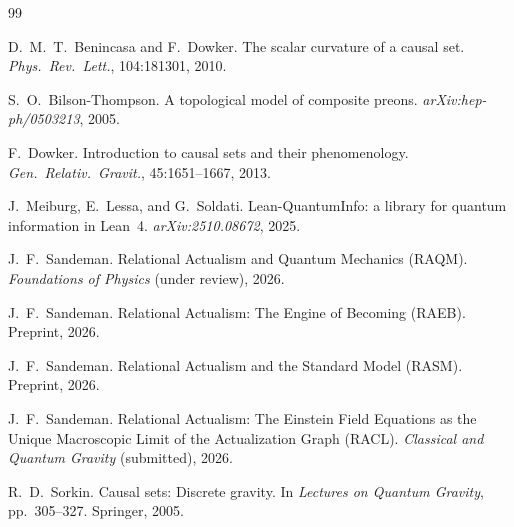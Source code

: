 \documentclass[11pt,a4paper]{article}
\begin{document}
\begin{thebibliography}{99}

D.~M.~T.~Benincasa and F.~Dowker.
\newblock The scalar curvature of a causal set.
\newblock \textit{Phys.\ Rev.\ Lett.}, 104:181301, 2010.

S.~O.~Bilson-Thompson.
\newblock A topological model of composite preons.
\newblock \textit{arXiv:hep-ph/0503213}, 2005.

F.~Dowker.
\newblock Introduction to causal sets and their phenomenology.
\newblock \textit{Gen.\ Relativ.\ Gravit.}, 45:1651--1667, 2013.

J.~Meiburg, E.~Lessa, and G.~Soldati.
\newblock Lean-QuantumInfo: a library for quantum information in Lean~4.
\newblock \textit{arXiv:2510.08672}, 2025.

J.~F.~Sandeman.
\newblock Relational Actualism and Quantum Mechanics (RAQM).
\newblock \textit{Foundations of Physics} (under review), 2026.

J.~F.~Sandeman.
\newblock Relational Actualism: The Engine of Becoming (RAEB).
\newblock Preprint, 2026.

J.~F.~Sandeman.
\newblock Relational Actualism and the Standard Model (RASM).
\newblock Preprint, 2026.

J.~F.~Sandeman.
\newblock Relational Actualism: The Einstein Field Equations as the Unique Macroscopic Limit
  of the Actualization Graph (RACL).
\newblock \textit{Classical and Quantum Gravity} (submitted), 2026.

R.~D.~Sorkin.
\newblock Causal sets: Discrete gravity.
\newblock In \textit{Lectures on Quantum Gravity}, pp.~305--327. Springer, 2005.

\end{thebibliography}
\end{document}
